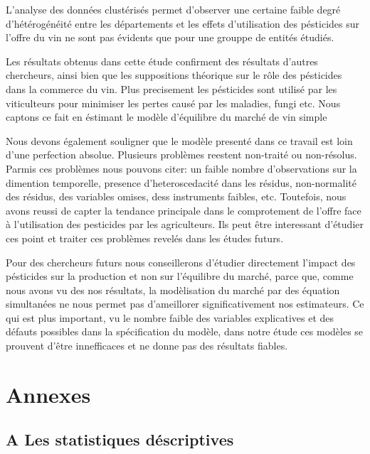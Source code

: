 \documentclass[11pt,]{article}
\begin{document}
L'analyse des données clustérisés permet d'observer une certaine faible
degré d'hétérogénéité entre les départements et les effets d'utilisation
des pésticides sur l'offre du vin ne sont pas évidents que pour une
grouppe de entités étudiés.

Les résultats obtenus dans cette étude confirment des résultats d'autres
chercheurs, ainsi bien que les suppositions théorique sur le rôle des
pésticides dans la commerce du vin. Plus precisement les pésticides sont
utilisé par les viticulteurs pour minimiser les pertes causé par les
maladies, fungi etc. Nous captons ce fait en éstimant le modèle
d'équilibre du marché de vin simple

Nous devons également souligner que le modèle presenté dans ce travail
est loin d'une perfection absolue. Plusieurs problèmes reestent
non-traité ou non-résolus. Parmis ces problèmes nous pouvons citer: un
faible nombre d'observations sur la dimention temporelle, presence
d'heteroscedacité dans les résidus, non-normalité des résidus, des
variables omises, dess instruments faibles, etc. Toutefois, nous avons
reussi de capter la tendance principale dans le comprotement de l'offre
face à l'utilisation des pesticides par les agriculteurs. Ils peut être
interessant d'étudier ces point et traiter ces problèmes revelés dans
les études futurs.

Pour des chercheurs futurs nous conseillerons d'étudier directement
l'impact des pésticides sur la production et non sur l'équilibre du
marché, parce que, comme nous avons vu des nos résultats, la
modèlisation du marché par des équation simultanées ne nous permet pas
d'ameillorer significativement nos estimateurs. Ce qui est plus
important, vu le nombre faible des variables explicatives et des défauts
possibles dans la spécification du modèle, dans notre étude ces modèles
se prouvent d'être innefficaces et ne donne pas des résultats fiables.

\newpage

\hypertarget{annexes}{%
\section{Annexes}\label{annexes}}

\hypertarget{a-les-statistiques-descriptives}{%
\subsection{A Les statistiques
déscriptives}\label{a-les-statistiques-descriptives}}
\end{document}
